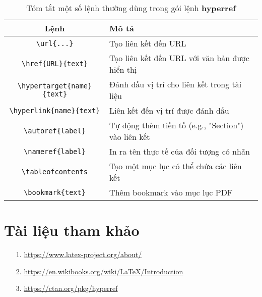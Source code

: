 \documentclass[a4paper,12pt]{article}
\begin{document}
\begin{table}[h]
\centering %
\caption{Tóm tắt một số lệnh thường dùng trong gói lệnh \textbf{hyperref}}
\begin{tabular}{|c|p{10cm}|}
\hline
\textbf{Lệnh} & \textbf{Mô tả} \\
\hline
\texttt{\textbackslash url\{...\}} & Tạo liên kết đến URL \\
\texttt{\textbackslash href\{URL\}\{text\}} & Tạo liên kết đến URL với văn bản được hiển thị \\
\texttt{\textbackslash hypertarget\{name\}\{text\}} & Đánh dấu vị trí cho liên kết trong tài liệu \\
\texttt{\textbackslash hyperlink\{name\}\{text\}} & Liên kết đến vị trí được đánh dấu \\
\texttt{\textbackslash autoref\{label\}} & Tự động thêm tiền tố (e.g., "Section") vào liên kết \\
\texttt{\textbackslash nameref\{label\}} & In ra tên thực tế của đối tượng có nhãn \\
\texttt{\textbackslash tableofcontents} & Tạo một mục lục có thể chứa các liên kết \\
\texttt{\textbackslash bookmark\{text\}} & Thêm bookmark vào mục lục PDF \\
\hline
\end{tabular}
\end{table}
\section*{Tài liệu tham khảo}

\begin{itemize}
	\item[1.] \href{https://www.latex-project.org/about/}{https://www.latex-project.org/about/}
	\item[2.] \href{https://en.wikibooks.org/wiki/LaTeX/Introduction}{https://en.wikibooks.org/wiki/LaTeX/Introduction}
	\item[3.] \href{https://ctan.org/pkg/hyperref}{https://ctan.org/pkg/hyperref}
\end{itemize}
\end{document}
